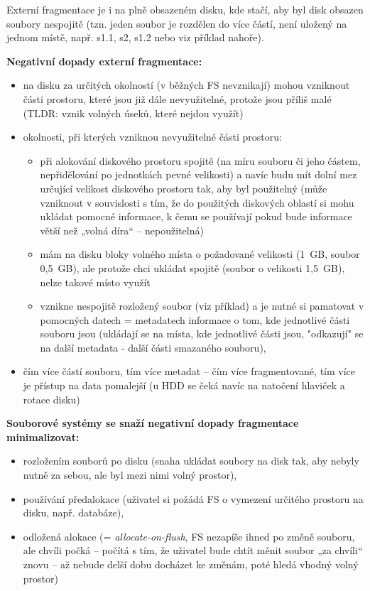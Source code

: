 \documentclass[a4paper, 11pt]{article}
\begin{document}
Externí fragmentace je i na plně obsazeném disku, kde stačí, aby byl disk obsazen soubory nespojitě (tzn. jeden soubor je rozdělen do více částí, není uložený na jednom místě, např. s1.1, s2, s1.2 nebo viz příklad nahoře).

\textbf{Negativní dopady externí fragmentace:}
\begin{itemize}
    \item na disku za určitých okolností (v běžných FS nevznikají) mohou vzniknout části prostoru, které jsou již dále nevyužitelné, protože jsou příliš malé (TLDR: vznik volných úseků, které nejdou využít)
    \item okolnosti, při kterých vzniknou nevyužitelné části prostoru:
    \begin{itemize}
        \item při alokování diskového prostoru spojitě (na míru souboru či jeho částem, nepřidělování po jednotkách pevné velikosti) a navíc budu mít dolní mez určující velikost diskového prostoru tak, aby byl použitelný (může vzniknout v souvislosti s tím, že do použitých diskových oblastí si mohu ukládat pomocné informace, k čemu se používají pokud bude informace větší než „volná díra“ -- nepoužitelná)
        \item mám na disku bloky volného místa o požadované velikosti (1~GB, soubor 0,5~GB), ale protože chci ukládat spojitě (soubor o velikosti 1,5~GB), nelze takové místo využít
        \item vznikne nespojitě rozložený soubor (viz příklad) a je nutné si pamatovat v pomocných datech = metadatech informace o tom, kde jednotlivé části souboru jsou (ukládají se na místa, kde jednotlivé části jsou, "odkazují" se na další metadata - další části smazaného souboru),
    \end{itemize}
    \item čím více částí souboru, tím více metadat -- čím více fragmentované, tím více je přístup na data pomalejší (u HDD se čeká navíc na natočení hlaviček a rotace disku)
\end{itemize}
 
\textbf{Souborové systémy se snaží negativní dopady fragmentace minimalizovat:}
\begin{itemize}
 \item rozložením souborů po disku (snaha ukládat soubory na disk tak, aby nebyly nutně za sebou, ale byl mezi nimi volný prostor),
 \item používání předalokace (uživatel si požádá FS o vymezení určitého prostoru na disku, např. databáze),
 \item odložená alokace (= \emph{allocate-on-flush}, FS nezapíše ihned po změně souboru, ale chvíli počká -- počítá s tím, že uživatel bude chtít měnit soubor „za chvíli“ znovu -- až nebude delší dobu docházet ke změnám, poté hledá vhodný volný prostor)
\end{itemize}
\end{document}
